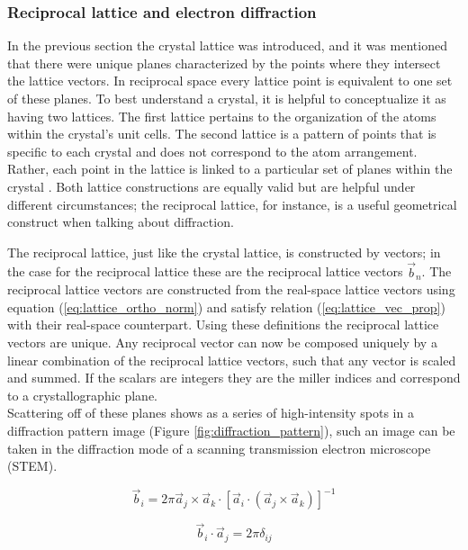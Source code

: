 \subsubsection{Reciprocal lattice and electron diffraction}
\label{sec:diffraction}
In the previous section the crystal lattice was introduced, and it was mentioned that there were unique planes characterized by the points where they intersect the lattice vectors.
In reciprocal space every lattice point is equivalent to one set of these planes.
To best understand a crystal, it is helpful to conceptualize it as having two lattices. The first lattice pertains to the organization of the atoms within the crystal's unit cells. The second lattice is a pattern of points that is specific to each crystal and does not correspond to the atom arrangement. Rather, each point in the lattice is linked to a particular set of planes within the crystal \cite{Williams2009-ww}.
Both lattice constructions are equally valid but are helpful under different circumstances; the reciprocal lattice, for instance, is a useful geometrical construct when talking about diffraction.

The reciprocal lattice, just like the crystal lattice, is constructed by vectors; in the case for the reciprocal lattice these are the reciprocal lattice vectors $\vec{b}_n$.
The reciprocal lattice vectors are constructed from the real-space lattice vectors using equation (\ref{eq:lattice_ortho_norm}) and satisfy relation (\ref{eq:lattice_vec_prop}) with their real-space counterpart.
Using these definitions the reciprocal lattice vectors are unique.
Any reciprocal vector can now be composed uniquely by a linear combination of the reciprocal lattice vectors, such that any vector is scaled and summed. If the scalars are integers they are the miller indices and correspond to a crystallographic plane. \\
Scattering off of these planes shows as a series of high-intensity spots in a diffraction pattern image (Figure \ref{fig:diffraction_pattern}), such an image can be taken in the diffraction mode of a scanning transmission electron microscope (STEM). \\

\begin{minipage}{0.5\textwidth}
    \begin{equation}
        \vec{b}_i = 2 \pi \vec{a}_j \times \vec{a}_k \cdot \left[ \vec{a}_i \cdot ( \vec{a}_j \times \vec{a}_k ) \right]^{-1} 
        \label{eq:lattice_ortho_norm}
    \end{equation}
\end{minipage}%
\begin{minipage}{0.5\textwidth}
    \begin{equation}
        \vec{b}_i \cdot \vec{a}_j = 2\pi \delta_{ij}
        \label{eq:lattice_vec_prop}
    \end{equation}
\end{minipage}\\

